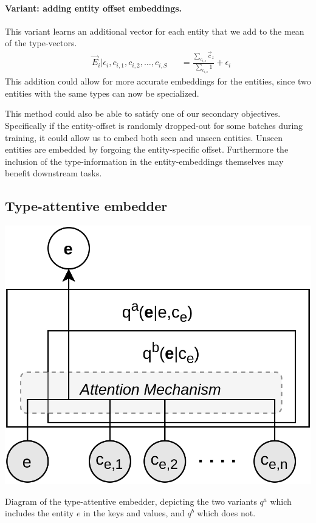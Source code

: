 \paragraph{Variant: adding entity offset embeddings.}
This variant learns an additional vector for each entity that we add to the mean of the type-vectors.
\begin{align}
    & \vec{E}_i | \epsilon_i, c_{i,1}, c_{i,2}, \dots, c_{i,S} && 
    = \frac{\sum_{c_{i,z}} \vec{c}_z}{\sum_{c_{i,z}} 1} + \epsilon_i
\end{align}
%
This addition could allow for more accurate embeddings for the entities, since two entities with the same types can now be specialized. 

This method could also be able to satisfy one of our secondary objectives. Specifically if the entity-offset is randomly dropped-out for some batches during training, it could allow us to embed both seen and unseen entities. Unseen entities are embedded by forgoing the entity-specific offset.
%
Furthermore the inclusion of the type-information in the entity-embeddings themselves may benefit downstream tasks.

\subsection{Type-attentive embedder}
\begin{marginfigure}%
    \centering
    \includegraphics[width=\linewidth]{figures/type-attentive.png}
    \caption[Diagram of the type-attentive embedder.]{Diagram of the type-attentive embedder, depicting the two variants $q^a$ which includes the entity $e$ in the keys and values, and $q^b$ which does not. }
    \label{fig:type_attn_embed}
\end{marginfigure}

